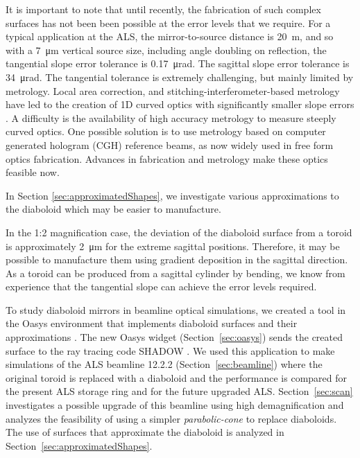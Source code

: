 \documentclass{iucr}       %
\begin{document}
It is important to note that until recently, the fabrication of such complex surfaces has not been been possible at the error levels that we require. For a typical application at the ALS, the mirror-to-source distance is \SI{20}{\meter}, and so with a \SI{7}{\micro\meter} vertical source size, including angle doubling on reflection, the tangential slope error tolerance is \SI{0.17}{\micro\radian}. The sagittal slope error tolerance is \SI{34}{\micro\radian}. The tangential tolerance is extremely challenging, but mainly limited by metrology. Local area correction, and stitching-interferometer-based metrology have led to the creation of 1D curved optics with significantly smaller slope errors \cite{Yamauchi2002}. 
A difficulty is the availability of high accuracy metrology to measure steeply curved optics. One possible solution is to use metrology based on computer generated hologram (CGH) reference beams, as now widely used in free form optics fabrication. Advances in fabrication and metrology make these optics feasible now.

In Section \ref{sec:approximatedShapes}, we investigate various approximations to the diaboloid which may be easier to manufacture.

In the 1:2 magnification case, the deviation of the diaboloid surface from a toroid is approximately \SI{2}{\micro\meter} for the extreme sagittal positions. Therefore, it may be possible to manufacture them using gradient deposition in the sagittal direction. As a toroid can be produced from a sagittal cylinder by bending, we know from experience that the tangential slope can achieve the error levels required.


To study diaboloid mirrors in beamline optical simulations, we created a tool in the Oasys environment \cite{codeOASYS} that implements diaboloid surfaces and their approximations \cite{valSPIE} \cite{val2021}. The new Oasys widget (Section~\ref{sec:oasys}) sends the created surface to the ray tracing code SHADOW \cite{codeSHADOW}. We used this application to make simulations of the ALS beamline 12.2.2 (Section~\ref{sec:beamline}) where the original toroid is replaced with a diaboloid and the performance is compared for the present ALS storage ring and for the future upgraded ALS. Section~\ref{sec:scan} investigates a possible upgrade of this beamline using high demagnification and analyzes the feasibility of using a simpler \emph{parabolic-cone} to replace diaboloids. The use of surfaces that approximate the diaboloid is analyzed in Section~\ref{sec:approximatedShapes}.
\end{document}
